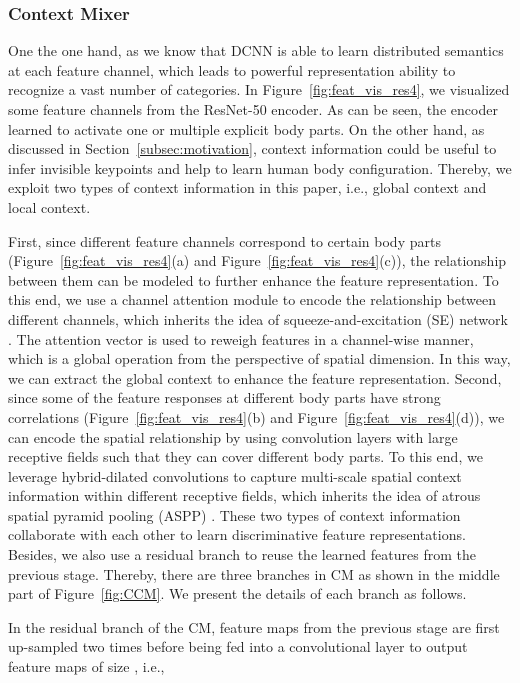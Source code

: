 \documentclass[twocolumn]{svjour3}          \smartqed  \usepackage{natbib}
\begin{document}
\subsubsection{Context Mixer}
\label{subsubsec:CM}
One the one hand, as we know that DCNN is able to learn distributed semantics at each feature channel, which leads to powerful representation ability to recognize a vast number of categories. In Figure~\ref{fig:feat_vis_res4}, we visualized some feature channels from the ResNet-50 encoder. As can be seen, the encoder learned to activate one or multiple explicit body parts. On the other hand, as discussed in Section~\ref{subsec:motivation}, context information could be useful to infer invisible keypoints and help to learn human body configuration. Thereby, we exploit two types of context information in this paper, i.e., global context and local context.

First, since different feature channels correspond to certain body parts (Figure~\ref{fig:feat_vis_res4}(a) and Figure~\ref{fig:feat_vis_res4}(c)), the relationship between them can be modeled to further enhance the feature representation. To this end, we use a channel attention module to encode the relationship between different channels, which inherits the idea of squeeze-and-excitation (SE) network \citep{hu2018squeeze}. The attention vector is used to reweigh features in a channel-wise manner, which is a global operation from the perspective of spatial dimension. In this way, we can extract the global context to enhance the feature representation. Second, since some of the feature responses at different body parts have strong correlations (Figure~\ref{fig:feat_vis_res4}(b) and Figure~\ref{fig:feat_vis_res4}(d)), we can encode the spatial relationship by using convolution layers with large receptive fields such that they can cover different body parts. To this end, we leverage hybrid-dilated convolutions to capture multi-scale spatial context information within different receptive fields, which inherits the idea of atrous spatial pyramid pooling (ASPP) \citep{chen2018deeplab}. These two types of context information collaborate with each other to learn discriminative feature representations. Besides, we also use a residual branch to reuse the learned features from the previous stage. Thereby, there are three branches in CM as shown in the middle part of Figure~\ref{fig:CCM}. We present the details of each branch as follows.

In the residual branch of the  CM, feature maps  from the previous stage are first up-sampled two times before being fed into a  convolutional layer to output feature maps  of size , i.e., 
\end{document}
